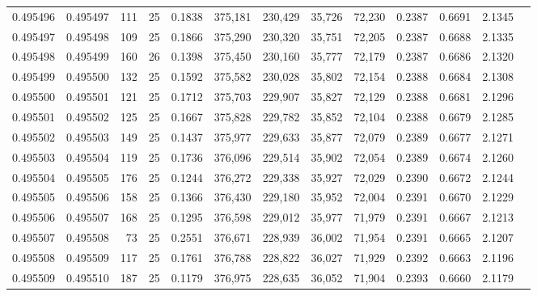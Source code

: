 \begin{tabular}{rrrrrrrrrrrrr}
0.495496 & 0.495497 &   111 &  25 &                                     0.1838 & 375,181 & 230,429 &  35,726 &  72,230 & 0.2387 & 0.6691 & 2.1345 \\
0.495497 & 0.495498 &   109 &  25 &                                     0.1866 & 375,290 & 230,320 &  35,751 &  72,205 & 0.2387 & 0.6688 & 2.1335 \\
0.495498 & 0.495499 &   160 &  26 &                                     0.1398 & 375,450 & 230,160 &  35,777 &  72,179 & 0.2387 & 0.6686 & 2.1320 \\
0.495499 & 0.495500 &   132 &  25 &                                     0.1592 & 375,582 & 230,028 &  35,802 &  72,154 & 0.2388 & 0.6684 & 2.1308 \\
0.495500 & 0.495501 &   121 &  25 &                                     0.1712 & 375,703 & 229,907 &  35,827 &  72,129 & 0.2388 & 0.6681 & 2.1296 \\
0.495501 & 0.495502 &   125 &  25 &                                     0.1667 & 375,828 & 229,782 &  35,852 &  72,104 & 0.2388 & 0.6679 & 2.1285 \\
0.495502 & 0.495503 &   149 &  25 &                                     0.1437 & 375,977 & 229,633 &  35,877 &  72,079 & 0.2389 & 0.6677 & 2.1271 \\
0.495503 & 0.495504 &   119 &  25 &                                     0.1736 & 376,096 & 229,514 &  35,902 &  72,054 & 0.2389 & 0.6674 & 2.1260 \\
0.495504 & 0.495505 &   176 &  25 &                                     0.1244 & 376,272 & 229,338 &  35,927 &  72,029 & 0.2390 & 0.6672 & 2.1244 \\
0.495505 & 0.495506 &   158 &  25 &                                     0.1366 & 376,430 & 229,180 &  35,952 &  72,004 & 0.2391 & 0.6670 & 2.1229 \\
0.495506 & 0.495507 &   168 &  25 &                                     0.1295 & 376,598 & 229,012 &  35,977 &  71,979 & 0.2391 & 0.6667 & 2.1213 \\
0.495507 & 0.495508 &    73 &  25 &                                     0.2551 & 376,671 & 228,939 &  36,002 &  71,954 & 0.2391 & 0.6665 & 2.1207 \\
0.495508 & 0.495509 &   117 &  25 &                                     0.1761 & 376,788 & 228,822 &  36,027 &  71,929 & 0.2392 & 0.6663 & 2.1196 \\
0.495509 & 0.495510 &   187 &  25 &                                     0.1179 & 376,975 & 228,635 &  36,052 &  71,904 & 0.2393 & 0.6660 & 2.1179 \\

\end{tabular}

